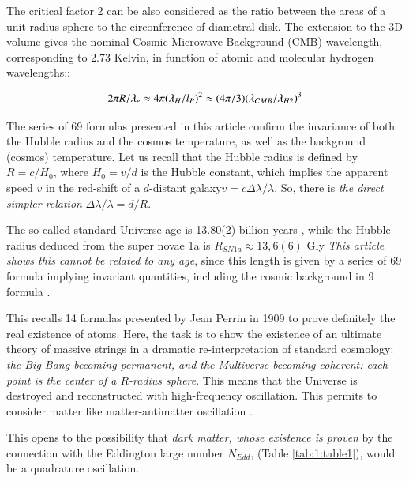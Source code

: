 \documentclass[a4paper,9pt]{article}
\begin{document}
    
    The critical factor 2 can be also considered as the ratio between the areas of a unit-radius sphere to the circonference of diametral disk. The extension to the 3D volume gives the nominal Cosmic Microwave Background (CMB) wavelength, corresponding to 2.73 Kelvin, in function of atomic and molecular hydrogen wavelengths:\cite{Sanchez}:
    
    \begin{equation}
        2\pi R/\lambdabar_e \approx 4\pi (\lambdabar_H/l_P)^2 \approx (4\pi/3) (\lambdabar_{CMB}/\lambdabar_{H2})^3
    \end{equation}

    The series of 69 formulas presented in this article confirm the invariance of both the Hubble radius and the cosmos temperature, as well as the background (cosmos) temperature. Let us recall that the Hubble radius is defined by $R = c/H_0$, where $H_0 = v/d$ is the Hubble constant, which implies the apparent speed $v$ in the red-shift of a $d$-distant galaxy$ v = c \Delta \lambda/\lambda$. So, there is \textit {the direct simpler relation} $\Delta \lambda/\lambda =  d/R$. 
    

    
    The so-called standard Universe age is 13.80(2) billion years \cite{Tanabashi}, while the Hubble radius deduced from the super novae 1a is $R_{SN1a} \approx 13,6(6)$ Gly \cite{Freeman}\textit{This article shows this cannot be related to any age}, since this length is given by a series of 69 formula implying invariant quantities, including the cosmic background in 9 formula . 
    
    
    This recalls 14 formulas presented by Jean Perrin in 1909 to prove definitely the real existence of atoms. Here, the task is to show the existence of an ultimate theory of massive strings in a dramatic re-interpretation of standard cosmology:\textit{ the Big Bang becoming permanent, and the Multiverse becoming coherent: each point is the center of a $R$-radius sphere}. This means that the Universe is destroyed and reconstructed with high-frequency oscillation. This permits to consider matter like matter-antimatter oscillation \cite{Sanchez2}. 
    
    This opens to the possibility that \textit {dark matter, whose existence is proven} by the connection with the Eddington large number $N_{Edd}$, (Table \ref{tab:1:table1}), would be a quadrature oscillation.
\end{document}
